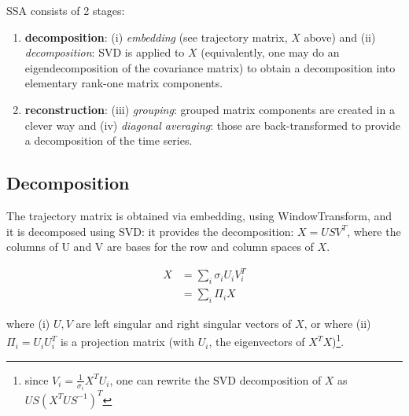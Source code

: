 \documentclass{article}
\begin{document}
SSA consists of 2 stages:
\begin{enumerate}
  \item \textbf{decomposition}: (i) \textit{embedding} (see trajectory matrix, $X$ above) and (ii) \textit{decomposition}: SVD is applied to $X$ (equivalently, one may do an eigendecomposition of the covariance matrix) to obtain a decomposition into elementary rank-one matrix components.
  \item \textbf{reconstruction}: (iii) \textit{grouping}: grouped matrix components are created in a clever way and (iv) \textit{diagonal averaging}: those are back-transformed to provide a decomposition of the time series.
\end{enumerate}


\subsection{Decomposition}

The trajectory matrix is obtained via embedding, using {\selectfont WindowTransform}, and it is decomposed using SVD: it provides the decomposition: $X=USV^T$, where the  columns of U and V are bases for the row and column spaces of $X$.

\begin{align}
X &= \sum_i\sigma_iU_iV_i^T\nonumber \\
  &= \sum_i \Pi_i X\nonumber
\end{align}

where (i) $U,V$ are left singular and right singular vectors of $X$, or where (ii) $\Pi_i=U_i U_i^T$ is a projection matrix (with $U_i$, the eigenvectors of $X^TX$)\footnote{since $V_i=\frac{1}{\sigma_i} X^TU_i$, one can rewrite the SVD decomposition of $X$ as $US(X^TUS^{-1})^T$}.\\
\end{document}
